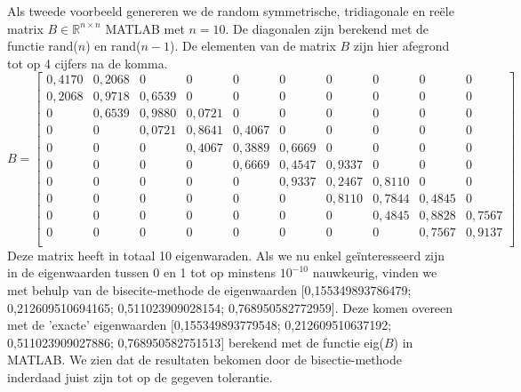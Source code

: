 Als tweede voorbeeld genereren we de random symmetrische, tridiagonale en re\"ele matrix $B \in \mathbb{R}^{n \times n}$ MATLAB met $n = 10$. De diagonalen zijn berekend met de functie rand($n$) en rand($n-1$). De elementen van de matrix $B$ zijn hier afegrond tot op 4 cijfers na de komma.
 $$B = \begin{bmatrix}
0,4170	&0,2068	&0	&0	&0	&0	&0	&0	&0	&0 \\
0,2068	&0,9718	&0,6539	&0	&0	&0	&0	&0	&0	&0 \\
0	&0,6539	&0,9880	&0,0721	&0	&0	&0	&0	&0	&0 \\
0	&0	&0,0721	&0,8641	&0,4067	&0	&0	&0	&0	&0 \\
0	&0	&0	&0,4067	&0,3889	&0,6669	&0	&0	&0	&0 \\
0	&0	&0	&0	&0,6669	&0,4547	&0,9337	&0	&0	&0 \\
0	&0	&0	&0	&0	&0,9337	&0,2467	&0,8110	&0	&0 \\
0	&0	&0	&0	&0	&0	&0,8110 &0,7844	&0,4845	&0 \\
0	&0	&0	&0	&0	&0	&0	&0,4845	&0,8828	&0,7567 \\
0	&0	&0	&0	&0	&0	&0	&0	&0,7567	&0,9137 \\
\end{bmatrix}$$
Deze matrix heeft in totaal 10 eigenwaraden. Als we nu enkel ge\"interesseerd zijn in de eigenwaarden tussen 0 en 1 tot op minstens $10^{-10}$ nauwkeurig, vinden we met behulp van de bisecite-methode de eigenwaarden [0,155349893786479; 0,212609510694165; 0,511023909028154; 0,768950582772959]. Deze komen overeen met de 'exacte' eigenwaarden [0,155349893779548; 0,212609510637192; 0,511023909027886; 0,768950582751513] berekend met de functie eig($B$) in MATLAB. We zien dat de resultaten bekomen door de bisectie-methode inderdaad juist zijn tot op de gegeven tolerantie.